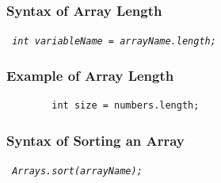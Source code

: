 \documentclass[openany]{book}  %
\begin{document}
\subsubsection{Syntax of Array Length}
\begin{center}
    \tt{
        \textit{int variableName = arrayName.length;}
    }
\end{center}
% 
% 
\subsubsection{Example of Array Length}
\begin{center}
    \begin{verbatim}
        int size = numbers.length;
    \end{verbatim}
\end{center}
% 
% 
\subsubsection{Syntax of Sorting an Array}
\begin{center}
    \tt{
        \textit{Arrays.sort(arrayName);}
    }
\end{center}
% 
% 
\end{document}
